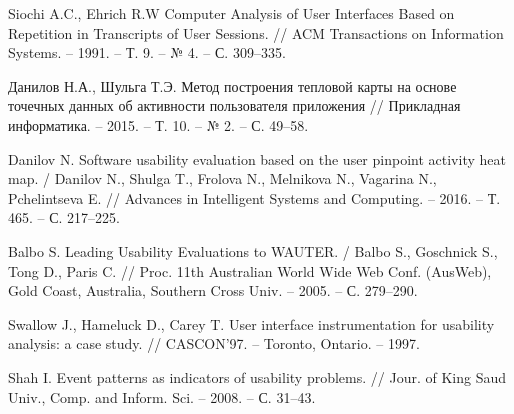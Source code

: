 
\begin{thebibliography}{1}
	Siochi A.C., Ehrich R.W
	Computer Analysis of User Interfaces Based on Repetition in Transcripts of User Sessions.
	// ACM Transactions on Information Systems. -- 1991. -- Т. 9. -- № 4. -- С. 309–335.
	
	Данилов Н.А., Шульга Т.Э.
	Метод построения тепловой карты на основе точечных данных об активности пользователя приложения
	// Прикладная информатика. -- 2015. -- Т. 10. -- № 2. -- С. 49–58.
	
	Danilov N.
	Software usability evaluation based on the user pinpoint activity heat map. / Danilov N., Shulga T., Frolova N., Melnikova N., Vagarina N., Pchelintseva E.
	// Advances in Intelligent Systems and Computing. -- 2016. -- Т. 465. -- С. 217–225.
	
	Balbo S.
	Leading Usability Evaluations to WAUTER. /
	Balbo S., Goschnick S., Tong D., Paris C.
	// Proc. 11th Australian World Wide Web Conf. (AusWeb), Gold Coast, Australia, Southern Cross Univ. -- 2005. -- С. 279–290.
	
	Swallow J., Hameluck D., Carey T.
	User interface	instrumentation for usability analysis: a case study.
	// CASCON’97. -- Toronto, Ontario. -- 1997.
	
	Shah I.
	Event patterns as indicators of usability problems.
	// Jour. of King Saud Univ., Comp. and Inform. Sci. -- 2008. -- С. 31–43.
	

\end{thebibliography}
